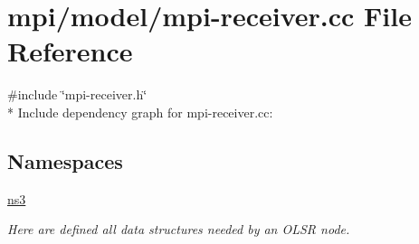 \hypertarget{mpi-receiver_8cc}{}\section{mpi/model/mpi-\/receiver.cc File Reference}
\label{mpi-receiver_8cc}
{\ttfamily \#include \char`\"{}mpi-\/receiver.\+h\char`\"{}}\\*
Include dependency graph for mpi-\/receiver.cc\+:
\subsection*{Namespaces}
\begin{DoxyCompactItemize}
\item 
 \hyperlink{namespacens3}{ns3}
\begin{DoxyCompactList}\small\item\em Here are defined all data structures needed by an O\+L\+SR node. \end{DoxyCompactList}\end{DoxyCompactItemize}
